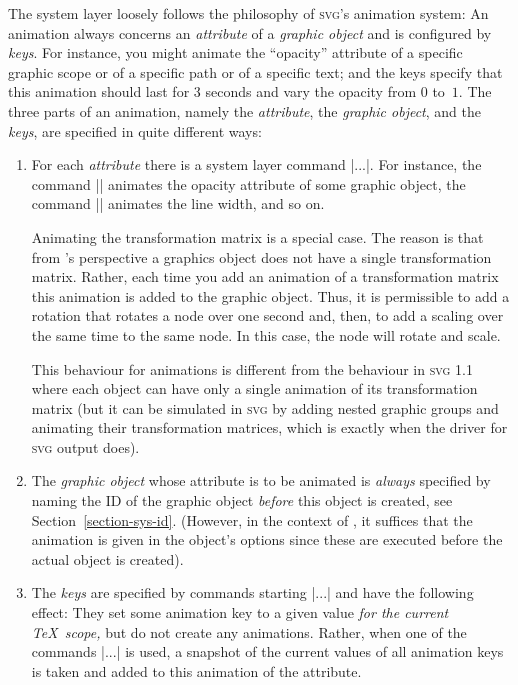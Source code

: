 The system layer loosely follows the philosophy of \textsc{svg}'s
animation system: An animation always concerns an \emph{attribute} of a
\emph{graphic object} and is configured by \emph{keys}. For instance,
you might animate the ``opacity'' attribute of a specific graphic
scope or of a specific path or of a specific text; and the keys
specify that this animation should last for 3 seconds and vary the
opacity from $0$ to~$1$. The three parts of an animation, namely the
\emph{attribute}, the \emph{graphic object}, and the \emph{keys}, are
specified in quite different ways:

\begin{enumerate}
\item For each \emph{attribute} there is a system layer command
  |\pgfsys@animate...|. For instance, the command |\pgfsys@animateopacity|
  animates the opacity attribute of some graphic object, the command
  |\pgfsys@animatelinewidth| animates the line width, and so on.

  Animating the transformation matrix is a special case. The reason is
  that from \pgfname's perspective a graphics object does not have a
  single transformation matrix. Rather, each time you add an animation
  of a transformation matrix this animation is added to the graphic
  object. Thus, it is permissible to add a rotation that rotates a
  node over one second and, then, to add a scaling over the same time
  to the same node. In this case, the node will rotate and scale.

  This behaviour for animations is different from the behaviour in
  \textsc{svg} 1.1 where each object can have only a single animation
  of its transformation matrix (but it can be simulated in
  \textsc{svg} by adding nested graphic groups and animating their
  transformation matrices, which is exactly when the driver for
  \textsc{svg} output does). 
\item The \emph{graphic object} whose attribute is to be animated is
  \emph{always} specified by naming the ID of the graphic object
  \emph{before} this object is created, see
  Section~\ref{section-sys-id}. (However, in the context of
  \tikzname, it suffices that the animation is given in the object's
  options since these are executed before the actual object is
  created). 
\item The \emph{keys} are specified by commands starting
  |\pgfsys@animation@...| and have the following effect: They set some
  animation key to a given value \emph{for the current \TeX\ scope,}
  but do not create any animations. Rather, when one of the commands
  |\pgfsys@animate...| is used, a snapshot of the current values of
  all animation keys is taken and added to this animation of the
  attribute.


\end{enumerate}
